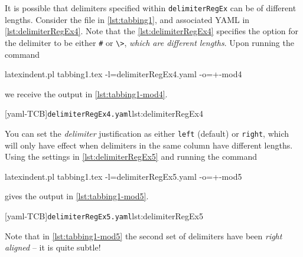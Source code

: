  \begin{example}
 It is possible that delimiters specified within \texttt{delimiterRegEx} can be of
 different lengths. Consider the file in \cref{lst:tabbing1}, and associated YAML in
 \cref{lst:delimiterRegEx4}. Note that the \cref{lst:delimiterRegEx4} specifies the option
 for the delimiter to be either \lstinline!#! or \lstinline!\>!, \emph{which are different
 lengths}. Upon running the command  

 \begin{commandshell}
latexindent.pl tabbing1.tex -l=delimiterRegEx4.yaml -o=+-mod4
\end{commandshell}

 we receive the output in \cref{lst:tabbing1-mod4}. 

 \begin{cmhtcbraster}[raster columns=3,
   raster left skip=-3.5cm,
   raster right skip=-2cm,
   raster column skip=.03\linewidth]
  [yaml-TCB]{\texttt{delimiterRegEx4.yaml}}{lst:delimiterRegEx4}
 \end{cmhtcbraster}
 \end{example}

 \begin{example}
 You can set the \emph{delimiter} justification as either \texttt{left} (default) or
 \texttt{right}, which will only have effect when delimiters in the same column have
 different lengths. Using the settings in \cref{lst:delimiterRegEx5} and running the
 command  

 \begin{commandshell}
latexindent.pl tabbing1.tex -l=delimiterRegEx5.yaml -o=+-mod5
\end{commandshell}

 gives the output in \cref{lst:tabbing1-mod5}. 

 \begin{cmhtcbraster}
  [yaml-TCB]{\texttt{delimiterRegEx5.yaml}}{lst:delimiterRegEx5}
 \end{cmhtcbraster}

 Note that in \cref{lst:tabbing1-mod5} the second set of delimiters have been \emph{right
 aligned} -- it is quite subtle!
 \end{example}

